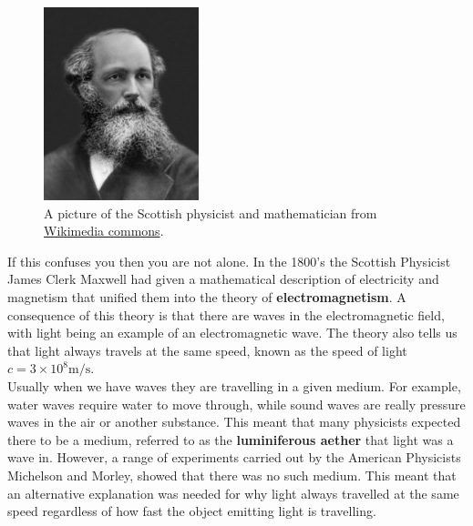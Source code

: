 \documentclass[a4paper,12pt]{book}
\begin{document}
\begin{figure}[ht]
    \centering
  \includegraphics[width=0.4\textwidth]{figures/James-Clerk-Maxwell.jpg}
    \caption{A picture of the Scottish physicist and mathematician from \href{https://upload.wikimedia.org/wikipedia/commons/b/b0/James-Clerk-Maxwell-1831-1879.jpg}{Wikimedia commons}.}
\end{figure}

If this confuses you then you are not alone. In the 1800's the Scottish Physicist James Clerk Maxwell had given a mathematical description of electricity and magnetism that unified them into the theory of \textbf{electromagnetism}. A consequence of this theory is that there are waves in the electromagnetic field, with light being an example of an electromagnetic wave. The theory also tells us that light always travels at the same speed, known as the speed of light $c=3\times 10^{8}\text{m/s}$.\\

Usually when we have waves they are travelling in a given medium. For example, water waves require water to move through, while sound waves are really pressure waves in the air or another substance.  This meant that many physicists expected there to be a medium, referred to as the \textbf{luminiferous aether} that light was a wave in. However, a range of experiments carried out by the American Physicists Michelson and Morley, showed that there was no such medium. This meant that an alternative explanation was needed for why light always travelled at the same speed regardless of how fast the object emitting light is travelling.\\
\end{document}
